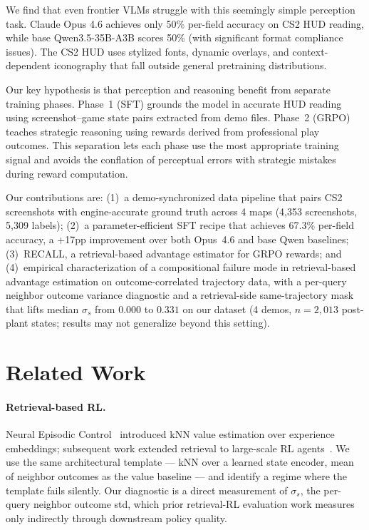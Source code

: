 \documentclass{article}
\begin{document}
We find that even frontier VLMs struggle with this seemingly simple perception task. Claude Opus 4.6 achieves only 50\% per-field accuracy on CS2 HUD reading, while base Qwen3.5-35B-A3B scores 50\% (with significant format compliance issues). The CS2 HUD uses stylized fonts, dynamic overlays, and context-dependent iconography that fall outside general pretraining distributions.

Our key hypothesis is that perception and reasoning benefit from separate training phases. Phase~1 (SFT) grounds the model in accurate HUD reading using screenshot--game state pairs extracted from demo files. Phase~2 (GRPO) teaches strategic reasoning using rewards derived from professional play outcomes. This separation lets each phase use the most appropriate training signal and avoids the conflation of perceptual errors with strategic mistakes during reward computation.

Our contributions are: (1)~a demo-synchronized data pipeline that pairs CS2 screenshots with engine-accurate ground truth across 4 maps (4{,}353 screenshots, 5{,}309 labels); (2)~a parameter-efficient SFT recipe that achieves 67.3\% per-field accuracy, a +17pp improvement over both Opus~4.6 and base Qwen baselines; (3)~RECALL, a retrieval-based advantage estimator for GRPO rewards; and (4)~empirical characterization of a compositional failure mode in retrieval-based advantage estimation on outcome-correlated trajectory data, with a per-query neighbor outcome variance diagnostic and a retrieval-side same-trajectory mask that lifts median $\sigma_s$ from $0.000$ to $0.331$ on our dataset (4 demos, $n{=}2{,}013$ post-plant states; results may not generalize beyond this setting).

\section{Related Work}
\label{sec:related}

\paragraph{Retrieval-based RL.} Neural Episodic Control~\cite{pritzel2017neural} introduced kNN value estimation over experience embeddings; subsequent work extended retrieval to large-scale RL agents~\cite{goyal2022retrieval}. We use the same architectural template --- kNN over a learned state encoder, mean of neighbor outcomes as the value baseline --- and identify a regime where the template fails silently. Our diagnostic is a direct measurement of $\sigma_s$, the per-query neighbor outcome std, which prior retrieval-RL evaluation work measures only indirectly through downstream policy quality.
\end{document}
